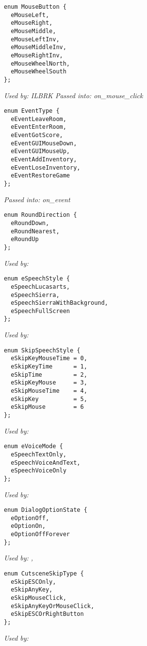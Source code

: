 \begin{verbatim}
enum MouseButton {
  eMouseLeft,
  eMouseRight,
  eMouseMiddle,
  eMouseLeftInv,
  eMouseMiddleInv,
  eMouseRightInv,
  eMouseWheelNorth,
  eMouseWheelSouth
};
\end{verbatim}
\it{Used by:}  ILBRK
\it{Passed into:} on_mouse_click

\begin{verbatim}
enum EventType {
  eEventLeaveRoom,
  eEventEnterRoom,
  eEventGotScore,
  eEventGUIMouseDown,
  eEventGUIMouseUp,
  eEventAddInventory,
  eEventLoseInventory,
  eEventRestoreGame
};
\end{verbatim}
\it{Passed into:} on_event

\begin{verbatim}
enum RoundDirection {
  eRoundDown,
  eRoundNearest,
  eRoundUp
};
\end{verbatim}
\it{Used by:} 

\begin{verbatim}
enum eSpeechStyle {
  eSpeechLucasarts,
  eSpeechSierra,
  eSpeechSierraWithBackground,
  eSpeechFullScreen
};
\end{verbatim}
\it{Used by:} 

\begin{verbatim}
enum SkipSpeechStyle {
  eSkipKeyMouseTime = 0,
  eSkipKeyTime      = 1,
  eSkipTime         = 2,
  eSkipKeyMouse     = 3,
  eSkipMouseTime    = 4,
  eSkipKey          = 5,
  eSkipMouse        = 6
};
\end{verbatim}
\it{Used by:} 

\begin{verbatim}
enum eVoiceMode {
  eSpeechTextOnly,
  eSpeechVoiceAndText,
  eSpeechVoiceOnly
};
\end{verbatim}
\it{Used by:} 

\begin{verbatim}
enum DialogOptionState {
  eOptionOff,
  eOptionOn,
  eOptionOffForever
};
\end{verbatim}
\it{Used by:} ,

\begin{verbatim}
enum CutsceneSkipType {
  eSkipESCOnly,
  eSkipAnyKey,
  eSkipMouseClick,
  eSkipAnyKeyOrMouseClick,
  eSkipESCOrRightButton
};
\end{verbatim}
\it{Used by:} 

